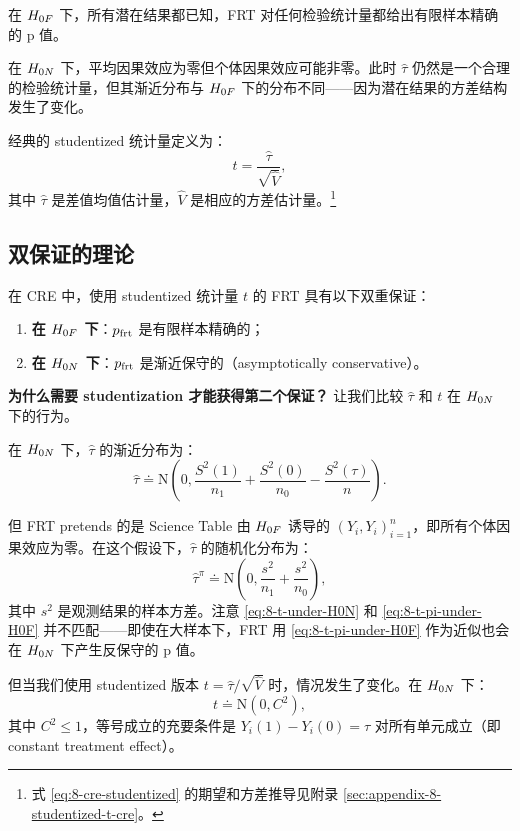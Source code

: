 在 $H_{0F}$ 下，所有潜在结果都已知，FRT 对任何检验统计量都给出有限样本精确的 p 值。

在 $H_{0N}$ 下，平均因果效应为零但个体因果效应可能非零。此时 $\hat\tau$ 仍然是一个合理的检验统计量，但其渐近分布与 $H_{0F}$ 下的分布不同——因为潜在结果的方差结构发生了变化。

经典的 studentized 统计量定义为：
\[
t = \frac{\hat\tau}{\sqrt{\hat V}} ,
\label{eq:8-cre-studentized}
\]
其中 $\hat\tau$ 是差值均值估计量，$\hat V$ 是相应的方差估计量。\footnote{式 \cref{eq:8-cre-studentized} 的期望和方差推导见附录 \cref{sec:appendix-8-studentized-t-cre}。}

\subsection{双保证的理论}
\label{sec:8-dual-theory}

\begin{Theorem}\label{th:8-dual-guarantee}
在 CRE 中，使用 studentized 统计量 $t$ 的 FRT 具有以下双重保证：
\begin{enumerate}
  \item \textbf{在 $H_{0F}$ 下}：$p_{\text{frt}}$ 是有限样本精确的；
  \item \textbf{在 $H_{0N}$ 下}：$p_{\text{frt}}$ 是渐近保守的（asymptotically conservative）。
\end{enumerate}
\end{Theorem}

\textbf{为什么需要 studentization 才能获得第二个保证？} 让我们比较 $\hat\tau$ 和 $t$ 在 $H_{0N}$ 下的行为。

在 $H_{0N}$ 下，$\hat\tau$ 的渐近分布为：
\[
\hat\tau \doteq \mathrm{N}\left(0, \frac{S^2(1)}{n_1} + \frac{S^2(0)}{n_0} - \frac{S^2(\tau)}{n}\right) .
\label{eq:8-t-under-H0N}
\]

但 FRT pretends 的是 Science Table 由 $H_{0F}$ 诱导的 $(Y_i, Y_i)_{i=1}^n$，即所有个体因果效应为零。在这个假设下，$\hat\tau$ 的随机化分布为：
\[
\hat\tau^\pi \doteq \mathrm{N}\left(0, \frac{s^2}{n_1} + \frac{s^2}{n_0}\right) ,
\label{eq:8-t-pi-under-H0F}
\]
其中 $s^2$ 是观测结果的样本方差。注意 \cref{eq:8-t-under-H0N} 和 \cref{eq:8-t-pi-under-H0F} 并不匹配——即使在大样本下，FRT 用 \cref{eq:8-t-pi-under-H0F} 作为近似也会在 $H_{0N}$ 下产生反保守的 p 值。

但当我们使用 studentized 版本 $t = \hat\tau / \sqrt{\hat V}$ 时，情况发生了变化。在 $H_{0N}$ 下：
\[
t \doteq \mathrm{N}(0, C^2) ,
\label{eq:8-t-asymp-under-H0N}
\]
其中 $C^2 \leq 1$，等号成立的充要条件是 $Y_i(1) - Y_i(0) = \tau$ 对所有单元成立（即 constant treatment effect）。

